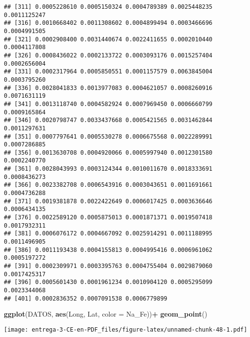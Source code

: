 \documentclass[
]{article}
\newenvironment{Shaded}{\begin{snugshade}}{\end{snugshade}}
\newcommand{\DataTypeTok}[1]{\textcolor[rgb]{0.13,0.29,0.53}{#1}}
\newcommand{\DecValTok}[1]{\textcolor[rgb]{0.00,0.00,0.81}{#1}}
\newcommand{\KeywordTok}[1]{\textcolor[rgb]{0.13,0.29,0.53}{\textbf{#1}}}
\newcommand{\NormalTok}[1]{#1}
\newcommand{\OperatorTok}[1]{\textcolor[rgb]{0.81,0.36,0.00}{\textbf{#1}}}
\newcommand{\StringTok}[1]{\textcolor[rgb]{0.31,0.60,0.02}{#1}}
\begin{document}
\begin{verbatim}
## [311] 0.0005228610 0.0005150324 0.0004789389 0.0025448235 0.0011125247
## [316] 0.0010668402 0.0011308602 0.0004899494 0.0003466696 0.0004991505
## [321] 0.0002908400 0.0031440674 0.0022411655 0.0002010440 0.0004117808
## [326] 0.0008436022 0.0002133722 0.0003093176 0.0015257404 0.0002656004
## [331] 0.0002317964 0.0005850551 0.0001157579 0.0063845004 0.0003795260
## [336] 0.0028041833 0.0013977083 0.0004621057 0.0008260916 0.0071631119
## [341] 0.0013118740 0.0004582924 0.0007969450 0.0006660799 0.0009165864
## [346] 0.0020798747 0.0033437668 0.0005421565 0.0031462844 0.0011297631
## [351] 0.0007797641 0.0005530278 0.0006675568 0.0022289991 0.0007286885
## [356] 0.0013630708 0.0004920066 0.0005997940 0.0012301580 0.0002240770
## [361] 0.0028043993 0.0003124344 0.0010011670 0.0018333691 0.0008436273
## [366] 0.0023382708 0.0006543916 0.0003043651 0.0011691661 0.0004736288
## [371] 0.0019381878 0.0022422649 0.0006017425 0.0003636646 0.0006434135
## [376] 0.0022589120 0.0005875013 0.0001871371 0.0019507418 0.0017932311
## [381] 0.0006076172 0.0004667092 0.0025914291 0.0011188995 0.0011496905
## [386] 0.0011193438 0.0004155813 0.0004995416 0.0006961062 0.0005197272
## [391] 0.0002309971 0.0003395763 0.0004755404 0.0029879060 0.0017425317
## [396] 0.0005601430 0.0001961234 0.0010904120 0.0005295099 0.0023344068
## [401] 0.0002836352 0.0007091538 0.0006779899
\end{verbatim}

\begin{Shaded}
\begin{Highlighting}[]
\KeywordTok{ggplot}\NormalTok{(DATOS, }\KeywordTok{aes}\NormalTok{(Long, Lat, }\DataTypeTok{color =}\NormalTok{ Na_Fe))}\OperatorTok{+}
\StringTok{  }\KeywordTok{geom_point}\NormalTok{()}
\end{Highlighting}
\end{Shaded}

\texttt{[image: entrega-3-CE-en-PDF\_files/figure-latex/unnamed-chunk-48-1.pdf]}

\begin{Shaded}
\end{Shaded}
\end{document}
